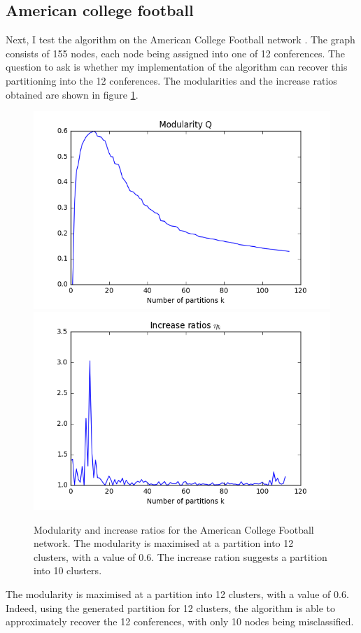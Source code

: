 \documentclass[12pt]{article}
\theoremstyle{definition}
\begin{document}
\subsection{American college football \cite{girvan2002community}}
Next, I test the algorithm on the American College Football network \cite{girvan2002community}. The graph consists of 155 nodes, each node being assigned into one of 12 conferences. The question to ask is whether my implementation of the algorithm can recover this partitioning into the 12 conferences. The modularities and the increase ratios obtained are shown in figure \ref{fig_football_eval}.
\begin{figure}
	\includegraphics[scale=0.44]{football_graph_Q}
	\includegraphics[scale=0.44]{football_graph_eta}
	\centering
	\caption{Modularity and increase ratios for the American College Football network. The modularity is maximised at a partition into 12 clusters, with a value of 0.6. The increase ration suggests a partition into 10 clusters.}
	\label{fig_football_eval}
\end{figure}
The modularity is maximised at a partition into 12 clusters, with a value of 0.6. Indeed, using the generated partition for 12 clusters, the algorithm is able to approximately recover the 12 conferences, with only 10 nodes being misclassified. 


\end{document}
